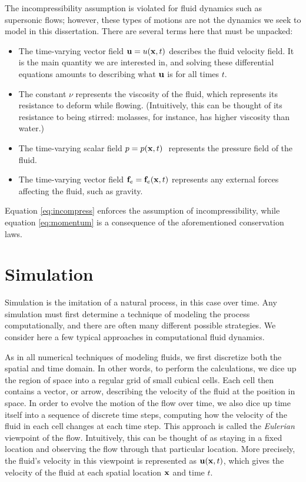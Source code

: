 The incompressibility assumption is violated for fluid dynamics such as supersonic flows; however, these types of motions are not the dynamics we seek to model in this dissertation. There are several terms here that must be unpacked:

\begin{itemize}
\item The time-varying vector field $\mathbf{u} = u(\mathbf{x}, t)$ describes the fluid velocity field. It is the main quantity we are interested in, and solving these differential equations amounts to describing what $\mathbf{u}$ is for all times $t$.
\item The constant $\nu$ represents the viscosity of the fluid, which represents its resistance to deform while flowing. (Intuitively, this can be thought of its resistance to being stirred: molasses, for instance, has higher viscosity than water.) 
\item The time-varying scalar field $p = p(\mathbf{x}, t)\ $ represents the pressure field of the fluid. 
\item The time-varying vector field $\mathbf{f}_e = \mathbf{f}_e(\mathbf{x}, t)$ represents any external forces affecting the fluid, such as gravity.
\end{itemize}
Equation \ref{eq:incompress} enforces the assumption of incompressibility, while equation \ref{eq:momentum} is a consequence of the aforementioned conservation laws.

\section{Simulation}

Simulation is the imitation of a natural process, in this case over time. Any simulation must first determine a technique of modeling the process computationally, and there are often many different possible strategies. We consider here a few typical approaches in computational fluid dynamics.

As in all numerical techniques of modeling fluids, we first discretize both the spatial and time domain. In other words, to perform the calculations, we dice up the region of space into a regular grid of small cubical cells. Each cell then contains a vector, or arrow, describing the velocity of the fluid at the position in space. In order to evolve the motion of the flow over time, we also dice up time itself into a sequence of discrete time steps, computing how the velocity of the fluid in each cell changes at each time step. This approach is called the {\em Eulerian} viewpoint of the flow. Intuitively, this can be thought of as staying in a fixed location and observing the flow through that particular location. More precisely, the fluid's velocity in this viewpoint is represented as $\mathbf{u}(\mathbf{x}, t)$, which gives the velocity of the fluid at each spatial location $\mathbf{x}$ and time $t$.

